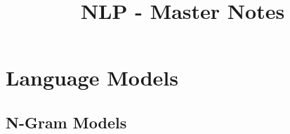 \documentclass[a4paper]{article}
\title{NLP - Master Notes}
\begin{document}
	\maketitle
	
	\section{Language Models}
	
	\subsection{N-Gram Models}
	
	
	
	
	
\end{document}
